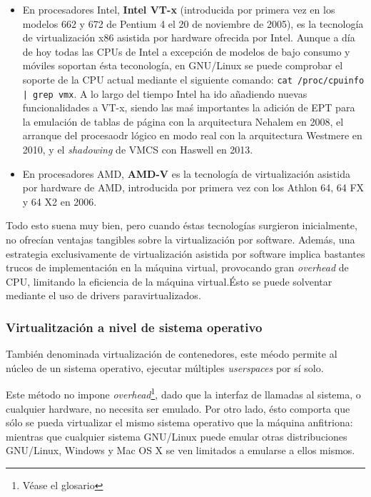 \begin{itemize}
    \item En procesadores Intel, \textbf{Intel VT-x} (introducida por primera vez en los modelos 662 y 672 de Pentium 4 el 20 de noviembre de 2005), es la tecnología de virtualización x86 asistida por hardware ofrecida por Intel. Aunque a día de hoy todas las CPUs de Intel a excepción de modelos de bajo consumo y móviles soportan ésta teconología, en GNU/Linux se puede comprobar el soporte de la CPU actual mediante el siguiente comando: \texttt{cat /proc/cpuinfo | grep vmx}. A lo largo del tiempo Intel ha ido añadiendo nuevas funcionalidades a VT-x, siendo las maś importantes la adición de EPT para la emulación de tablas de página con la arquitectura Nehalem en 2008, el arranque del procesaodr lógico en modo real con la arquitectura Westmere en 2010, y el \emph{shadowing} de VMCS con Haswell en 2013.

    \item En procesadores AMD, \textbf{AMD-V} es la tecnología de virtualización asistida por hardware de AMD, introducida por primera vez con los Athlon 64, 64 FX y 64 X2 en 2006. 
\end{itemize}

Todo esto suena muy bien, pero cuando éstas tecnologías surgieron inicialmente, no ofrecían ventajas tangibles sobre la virtualización por software. Además, una estrategia exclusivamente de virtualización asistida por software implica bastantes trucos de implementación en la máquina virtual, provocando gran \emph{\gls{overhead}} de CPU, limitando la eficiencia de la máquina virtual.\@ Ésto se puede solventar mediante el uso de drivers paravirtualizados.

\subsubsection{Virtualitzación a nivel de sistema operativo}
\label{subsubsubsec:virt_containers}

También denominada virtualización de contenedores, este méodo permite al núcleo de un sistema operativo, ejecutar múltiples \emph{userspaces} por sí solo.

Este método no impone \emph{\gls{overhead}}\footnote{Véase el glosario}, dado que la interfaz de llamadas al sistema, o cualquier hardware, no necesita ser emulado. Por otro lado, ésto comporta que sólo se pueda virtualizar el mismo sistema operativo que la máquina anfitriona: mientras que cualquier sistema GNU/Linux puede emular otras distribuciones GNU/Linux, Windows y Mac OS X se ven limitados a emularse a ellos mismos.

